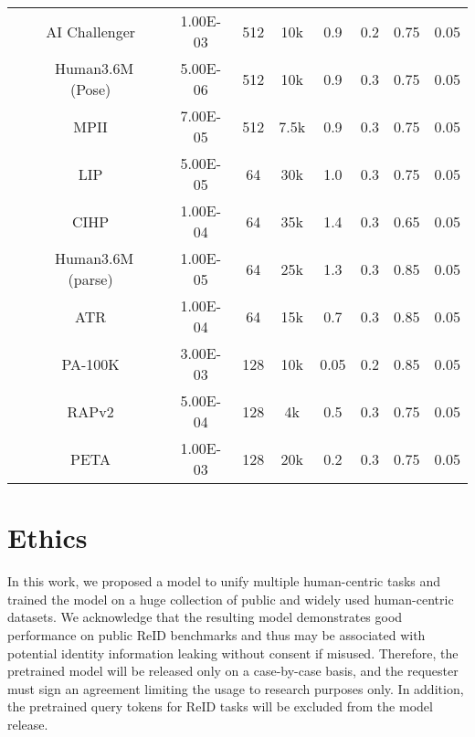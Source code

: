 \documentclass[10pt,twocolumn,letterpaper]{article}
\begin{document}
\begin{table*}[htbp]
{\begin{tabular}{ccccccccc}
          & AI Challenger~\cite{wu2019large}   & 1.00E-03 & 512   & 10k   & 0.9   & 0.2   & 0.75  & 0.05 \\
          & Human3.6M (Pose)~\cite{h36m_pami} & 5.00E-06 & 512   & 10k   & 0.9   & 0.3   & 0.75  & 0.05 \\
          & MPII~\cite{andriluka20142d}  & 7.00E-05 & 512   & 7.5k  & 0.9   & 0.3   & 0.75  & 0.05 \\
    \midrule
          & LIP~\cite{gong2017look}   & 5.00E-05 & 64    & 30k   & 1.0     & 0.3   & 0.75  & 0.05 \\
          & CIHP~\cite{gong2018instance}  & 1.00E-04 & 64    & 35k   & 1.4   & 0.3   & 0.65  & 0.05 \\
          & Human3.6M (parse)~\cite{h36m_pami} & 1.00E-05 & 64    & 25k   & 1.3   & 0.3   & 0.85  & 0.05 \\
          & ATR~\cite{liang2015human}   & 1.00E-04 & 64    & 15k   & 0.7   & 0.3   & 0.85  & 0.05 \\
          \midrule
     & PA-100K~\cite{liu2017hydraplus} & 3.00E-03 & 128   & 10k   & 0.05  & 0.2   & 0.85  & 0.05 \\
          & RAPv2~\cite{li2019richly} & 5.00E-04 & 128   & 4k    & 0.5   & 0.3   & 0.75  & 0.05 \\
          & PETA~\cite{deng2014pedestrian}  & 1.00E-03 & 128   & 20k   & 0.2   & 0.3   & 0.75  & 0.05 \\
    
    \bottomrule
    \end{tabular}}
  \label{tab:ftconfig}\end{table*}



\section{Ethics}
In this work, we proposed a model to unify multiple human-centric tasks and trained the model on a huge collection of public and widely used human-centric datasets. We acknowledge that the resulting model demonstrates good performance on public ReID benchmarks and thus may be associated with potential identity information leaking without consent if misused. Therefore, the pretrained model will be released only on a case-by-case basis, and the requester must sign an agreement limiting the usage to research purposes only. In addition, the pretrained query tokens for ReID tasks will be excluded from the model release.
\end{document}
